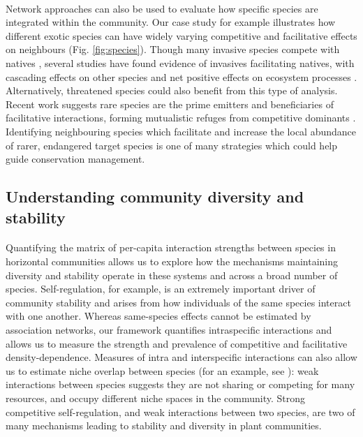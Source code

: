 \documentclass[a4,12pt]{article}
\begin{document}
        \paragraph{}
        Network approaches can also be used to evaluate how specific species are integrated within the community. Our case study for example illustrates how different exotic species can have widely varying competitive and facilitative effects on neighbours (Fig. \ref{fig:species}). Though many invasive species compete with natives \parencite{Naeem2000, Riley2008, Zheng2015}, several studies have found evidence of invasives facilitating natives, with cascading effects on other species and net positive effects on ecosystem processes \parencite{Rodriguez2006, Ramus2017}. Alternatively, threatened species could also benefit from this type of analysis. Recent work suggests rare species are the prime emitters and beneficiaries of facilitative interactions, forming mutualistic refuges from competitive dominants \parencite{Calatayud2019, Hines2020}. Identifying neighbouring species which facilitate and increase the local abundance of rarer, endangered target species is one of many strategies which could help guide conservation management.


    \subsection{Understanding community diversity and stability}

        \paragraph{}
        Quantifying the matrix of per-capita interaction strengths between species in horizontal communities allows us to explore how the mechanisms maintaining diversity and stability operate in these systems and across a broad number of species. Self-regulation, for example, is an extremely important driver of community stability \parencite{Barabas2017} and arises from how individuals of the same species interact with one another. Whereas same-species effects cannot be estimated by association networks, our framework quantifies intraspecific interactions and allows us to measure the strength and prevalence of competitive and facilitative density-dependence. Measures of intra and interspecific interactions can also allow us to estimate niche overlap between species (for an example, see \cite{Chu2015a}): weak interactions between species suggests they are not sharing or competing for many resources, and occupy different niche spaces in the community. Strong competitive self-regulation, and weak interactions between two species, are two of many mechanisms leading to stability and diversity in plant communities.
\end{document}
